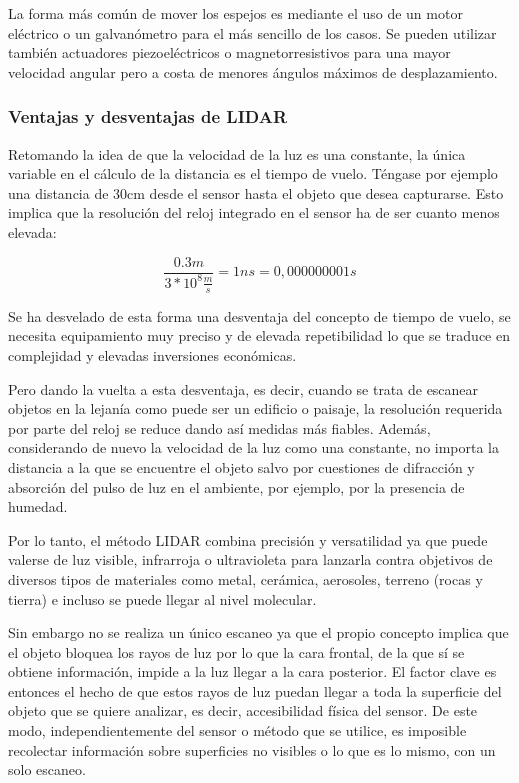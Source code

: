 La forma más común de mover los espejos es mediante el uso de un motor eléctrico o un galvanómetro para el más sencillo de los casos. Se pueden utilizar también actuadores piezoeléctricos o magnetorresistivos para una mayor velocidad angular pero a costa de menores ángulos máximos de desplazamiento.

\subsubsection{Ventajas y desventajas de LIDAR}

Retomando la idea de que la velocidad de la luz es una constante, la única variable en el cálculo de la distancia es el tiempo de vuelo. Téngase por ejemplo una distancia de 30cm desde el sensor hasta el objeto que desea capturarse. Esto implica que la resolución del reloj integrado en el sensor ha de ser cuanto menos elevada:

\begin{equation}
\frac{0.3m}{3*10^{8}\frac{m}{s}} = 1ns =0,000000001s
\end{equation}

Se ha desvelado de esta forma una desventaja del concepto de tiempo de vuelo, se necesita equipamiento muy preciso y de elevada repetibilidad lo que se traduce en complejidad y elevadas inversiones económicas.

Pero dando la vuelta a esta desventaja, es decir, cuando se trata de escanear objetos en la lejanía como puede ser un edificio o paisaje, la resolución requerida por parte del reloj se reduce dando así medidas más fiables. Además, considerando de nuevo la velocidad de la luz como una constante, no importa la distancia a la que se encuentre el objeto salvo por cuestiones de difracción y absorción del pulso de luz en el ambiente, por ejemplo, por la presencia de humedad.

Por lo tanto, el método LIDAR combina precisión y versatilidad ya que puede valerse de luz visible, infrarroja o ultravioleta para lanzarla contra objetivos de diversos tipos de materiales como metal, cerámica, aerosoles, terreno (rocas y tierra) e incluso se puede llegar al nivel molecular. 
 
Sin embargo no se realiza un único escaneo ya que el propio concepto implica que el objeto bloquea los rayos de luz por lo que la cara frontal, de la que sí se obtiene información, impide a la luz llegar a la cara posterior. El factor clave es entonces el hecho de que estos rayos de luz puedan llegar a toda la superficie del objeto que se quiere analizar, es decir, accesibilidad física del sensor.
De este modo, independientemente del sensor o método que se utilice, es imposible recolectar
información sobre superficies no visibles o lo que es lo mismo, con un solo escaneo.

